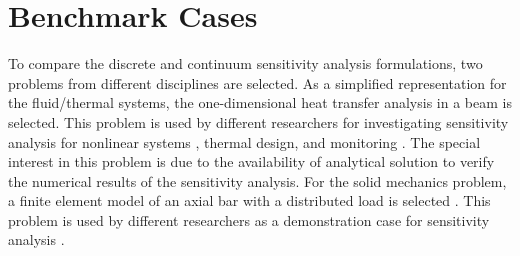 \section{Benchmark Cases}
To compare the discrete and continuum sensitivity analysis formulations, two problems from different disciplines are selected. As a simplified representation for the fluid/thermal systems, the one-dimensional heat transfer analysis in a beam is selected. This problem is used by different researchers for investigating sensitivity analysis for nonlinear systems \cite{dowding2001sensitivity}, thermal design, and monitoring \cite{szopa2005second, sorli2004computational}. The special interest in this problem is due to the availability of analytical solution to verify the numerical results of the sensitivity analysis. For the solid mechanics problem, a finite element model of an axial bar with a distributed load is selected \cite{szabo1991finite}. This problem is used by different researchers as a demonstration case for sensitivity analysis \cite{cross2014local, wickert2009least}.

